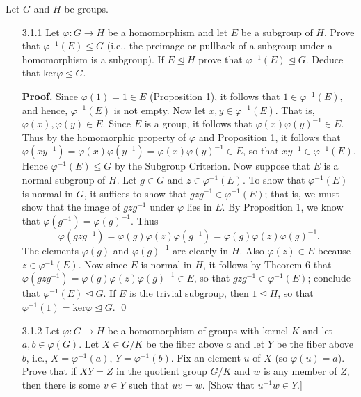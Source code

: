 Let $G$ and $H$ be groups.

\begin{enumerate}
   \item[3.1.1]   Let $\varphi : G \rightarrow H$ be a homomorphism and let $E$
                  be a subgroup of $H$. Prove that $\varphi^{-1}(E) \le G$
                  (i.e., the preimage or pullback of a subgroup under a
                  homomorphism is a subgroup). If $E \trianglelefteq H$ prove
                  that $\varphi^{-1}(E) \trianglelefteq G$. Deduce that
                  $\text{ker}\varphi \trianglelefteq G$.

      \textbf{Proof.} Since $\varphi(1) = 1 \in E$ (Proposition 1), it follows 
      that $1 \in \varphi^{-1}(E)$, and hence, $\varphi^{-1}(E)$ is not empty. 
      Now let $x, y \in \varphi^{-1}(E)$. That is, $\varphi(x),\varphi(y)\in E$. 
      Since $E$ is a group, it follows that $\varphi(x)\varphi(y)^{-1} \in E$. 
      Thus by the homomorphic property of $\varphi$ and Proposition 1, it
      follows that $\varphi(xy^{-1}) = \varphi(x)\varphi(y^{-1}) = \varphi(x)
      \varphi(y)^{-1} \in E$, so that $xy^{-1} \in \varphi^{-1}(E)$. Hence
      $\varphi^{-1}(E) \le G$ by the Subgroup Criterion. Now suppose that $E$ is 
      a normal subgroup of $H$. Let $g \in G$ and $z \in \varphi^{-1}(E)$. To 
      show that $\varphi^{-1}(E)$ is 
      normal in $G$, it suffices to show that $gzg^{-1} \in \varphi^{-1}(E)$; 
      that is, we must show that the image of $gzg^{-1}$ under $\varphi$ lies in 
      $E$. By Proposition 1, we know that $\varphi(g^{-1}) = \varphi(g)^{-1}$. 
      Thus
      $$\varphi(gzg^{-1}) = \varphi(g)\varphi(z)\varphi(g^{-1}) =
        \varphi(g)\varphi(z)\varphi(g)^{-1}.$$
      The elements $\varphi(g)$ and $\varphi(g)^{-1}$ are clearly in $H$. Also
      $\varphi(z) \in E$ because $z \in \varphi^{-1}(E)$. Now since $E$ is
      normal in $H$, it follows by Theorem 6 that
      $\varphi(gzg^{-1}) = \varphi(g)\varphi(z)\varphi(g)^{-1} \in E$, so that
      $gzg^{-1} \in \varphi^{-1}(E)$; conclude that
      $\varphi^{-1}(E) \trianglelefteq G$. If $E$ is the trivial subgroup, then
      $1 \trianglelefteq H$, so that
      $\varphi^{-1}(1) = \text{ker}\varphi \trianglelefteq G$. \qed
   \item[3.1.2]   Let $\varphi : G \rightarrow H$ be a homomorphism of groups
                  with kernel $K$ and let $a, b \in \varphi(G)$. Let
                  $X \in G/K$ be the fiber above $a$ and let $Y$ be the fiber
                  above $b$, i.e., $X = \varphi^{-1}(a)$, $Y = \varphi^{-1}(b)$.
                  Fix an element $u$ of $X$ (so $\varphi(u) = a$). Prove that if
                  $XY = Z$ in the quotient group $G/K$ and $w$ is any member of
                  $Z$, then there is some $v \in Y$ such that $uv = w$. [Show
                  that $u^{-1}w \in Y$.]


\end{enumerate}
